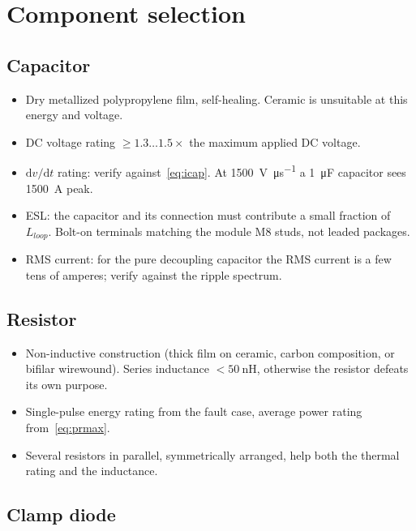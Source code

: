 \documentclass[11pt,a4paper]{article}
\begin{document}
\section{Component selection}

\subsection{Capacitor}

\begin{itemize}[nosep]
\item Dry metallized polypropylene film, self-healing. Ceramic is unsuitable
      at this energy and voltage.
\item DC voltage rating $\ge 1.3\ldots1.5\times$ the maximum applied DC
      voltage.
\item $\mathrm{d}v/\mathrm{d}t$ rating: verify against~\eqref{eq:icap}. At
      \SI{1500}{\volt\per\micro\second} a \SI{1}{\micro\farad} capacitor sees
      \SI{1500}{\ampere} peak.
\item ESL: the capacitor and its connection must contribute a small fraction
      of $L_{loop}$. Bolt-on terminals matching the module M8 studs, not
      leaded packages.
\item RMS current: for the pure decoupling capacitor the RMS current is a few
      tens of amperes; verify against the ripple spectrum.
\end{itemize}

\subsection{Resistor}

\begin{itemize}[nosep]
\item Non-inductive construction (thick film on ceramic, carbon composition,
      or bifilar wirewound). Series inductance $<\SI{50}{\nano\henry}$,
      otherwise the resistor defeats its own purpose.
\item Single-pulse energy rating from the fault case, average power rating
      from~\eqref{eq:prmax}.
\item Several resistors in parallel, symmetrically arranged, help both the
      thermal rating and the inductance.
\end{itemize}

\subsection{Clamp diode}
\end{document}
